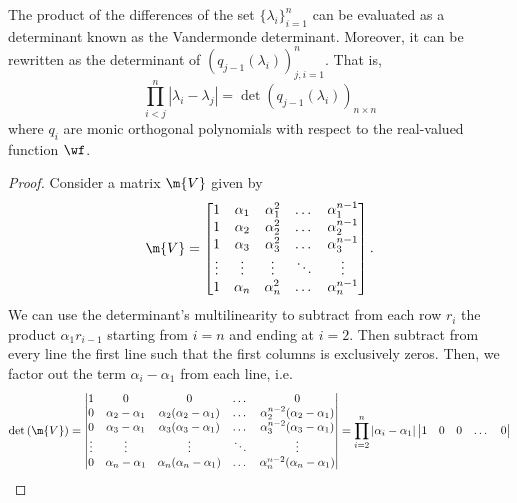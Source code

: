 \begin{proposicao} \label{Prop: Vandermonde} The product of the differences of the set $\{\lambda_i\}_{i=1}^n$ can be evaluated as a determinant known as the Vandermonde determinant. Moreover, it can be rewritten as the determinant of $\left(q_{j-1}(\lambda_i)\right)_{j,i = 1}^n$. That is, 
	\begin{equation}
		\prod_{i<j}^{n} |\lambda_i - \lambda_j| = {\det\left(q_{j-1}(\lambda_i)\right)}_{n\times n}
	\end{equation}
	where $q_i$ are monic orthogonal polynomials with respect to the real-valued function $\wf$.
\end{proposicao}
\begin{proof}
Consider a matrix $\m{V}$ given by 
\begin{equation}
	\m{V} = 
	\begin{bmatrix}
		1 & \alpha_1 & \alpha_1^2 & \dots & \alpha_1^{n-1} \\
		1 & \alpha_2 & \alpha_2^2 & \dots & \alpha_2^{n-1} \\
		1 & \alpha_3 & \alpha_3^2 & \dots & \alpha_3^{n-1} \\
		\vdots & \vdots & \vdots & \ddots & \vdots \\
		1 & \alpha_n & \alpha_n^2 & \dots & \alpha_n^{n-1}
	\end{bmatrix}.
\end{equation}
We can use the determinant's multilinearity to subtract from each row $r_i$ the product $\alpha_1 r_{i-1}$ starting from $i = n$ and ending at $i = 2$. Then subtract from every line the first line such that the first columns is exclusively zeros. Then, we factor out the term $\alpha_i - \alpha_1$ from each line, i.e.
\begin{equation}
\det\left(\m{V}\right)=
\begin{vmatrix}
	1 & 0 & 0 & \dots & 0 \\
	0 & \alpha_2 - \alpha_1 & \alpha_2(\alpha_2 - \alpha_1) & \dots & \alpha_2^{n-2}(\alpha_2 - \alpha_1) \\
	0 & \alpha_3 - \alpha_1& \alpha_3(\alpha_3 - \alpha_1) & \dots & \alpha_3^{n-2} (\alpha_3 - \alpha_1)\\
	\vdots & \vdots & \vdots & \ddots & \vdots \\
	0 & \alpha_n- \alpha_1 & \alpha_n(\alpha_n - \alpha_1) & \dots & \alpha_n^{n-2}(\alpha_n - \alpha_1)
\end{vmatrix} = \prod_{i=2}^n |\alpha_i - \alpha_1|
\begin{vmatrix}
	1 & 0 & 0 & \dots & 0 \\

\end{vmatrix}
\end{equation}
\end{proof}

